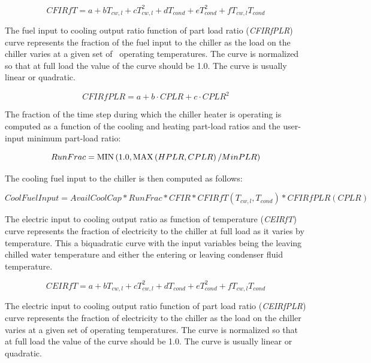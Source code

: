 \begin{equation}
CFIRfT = a + b{T_{cw,l}} + cT_{cw,l}^2 + d{T_{cond}} + eT_{cond}^2 + f{T_{cw,l}}{T_{cond}}
\end{equation}

The fuel input to cooling output ratio function of part load ratio (\emph{CFIRfPLR}) curve represents the fraction of the fuel input to the chiller as the load on the chiller varies at a given set of~ operating temperatures. The curve is normalized so that at full load the value of the curve should be 1.0. The curve is usually linear or quadratic.

\begin{equation}
CFIRfPLR = a + b \cdot CPLR + c \cdot CPL{R^2}
\end{equation}

The fraction of the time step during which the chiller heater is operating is computed as a function of the cooling and heating part-load ratios and the user-input minimum part-load ratio:

\begin{equation}
RunFrac = {\mathop{\rm MIN}\nolimits} \left( {1.0,{\mathop{\rm MAX}\nolimits} \left( {HPLR,CPLR} \right)/MinPLR} \right)
\end{equation}

The cooling fuel input to the chiller is then computed as follows:

\begin{equation}
CoolFuelInput = AvailCoolCap * RunFrac * CFIR * CFIRfT(T_{cw,l},T_{cond}) * CFIRfPLR(CPLR)
\end{equation}

The electric input to cooling output ratio as function of temperature (\emph{CEIRfT}) curve represents the fraction of electricity to the chiller at full load as it varies by temperature. This a biquadratic curve with the input variables being the leaving chilled water temperature and either the entering or leaving condenser fluid temperature.

\begin{equation}
CEIRfT = a + b{T_{cw,l}} + cT_{cw,l}^2 + d{T_{cond}} + eT_{cond}^2 + f{T_{cw,l}}{T_{cond}}
\end{equation}

The electric input to cooling output ratio function of part load ratio (\emph{CEIRfPLR}) curve represents the fraction of electricity to the chiller as the load on the chiller varies at a given set of operating temperatures. The curve is normalized so that at full load the value of the curve should be 1.0. The curve is usually linear or quadratic.

